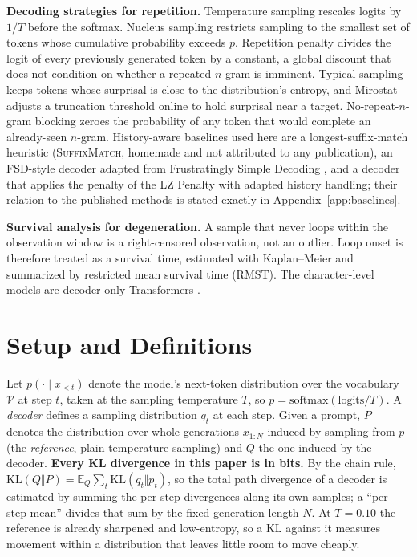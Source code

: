 \documentclass[11pt]{article}
\newcommand{\KL}{\mathrm{KL}}
\newcommand{\E}{\mathbb{E}}
\begin{document}
\textbf{Decoding strategies for repetition.} Temperature sampling rescales logits by $1/T$ before the softmax. Nucleus sampling \citep{holtzman2020curious} restricts sampling to the smallest set of tokens whose cumulative probability exceeds $p$. Repetition penalty \citep{keskar2019ctrl} divides the logit of every previously generated token by a constant, a global discount that does not condition on whether a repeated $n$-gram is imminent. Typical sampling \citep{meister2023typical} keeps tokens whose surprisal is close to the distribution's entropy, and Mirostat \citep{basu2021mirostat} adjusts a truncation threshold online to hold surprisal near a target. No-repeat-$n$-gram blocking \citep{paulus2018deep} zeroes the probability of any token that would complete an already-seen $n$-gram. History-aware baselines used here are a longest-suffix-match heuristic (\textsc{SuffixMatch}, homemade and not attributed to any publication), an FSD-style decoder adapted from Frustratingly Simple Decoding \citep{yang2023frustratingly}, and a decoder that applies the penalty of the LZ Penalty \citep{ginart2025lzpenalty} with adapted history handling; their relation to the published methods is stated exactly in Appendix~\ref{app:baselines}.

\textbf{Survival analysis for degeneration.} A sample that never loops within the observation window is a right-censored observation, not an outlier. Loop onset is therefore treated as a survival time, estimated with Kaplan--Meier \citep{kaplan1958nonparametric} and summarized by restricted mean survival time (RMST). The character-level models are decoder-only Transformers \citep{vaswani2017attention}.

\section{Setup and Definitions}
\label{sec:formal}

Let $p(\cdot\mid x_{<t})$ denote the model's next-token distribution over the vocabulary $\mathcal{V}$ at step $t$, taken at the sampling temperature $T$, so $p=\mathrm{softmax}(\text{logits}/T)$. A \emph{decoder} defines a sampling distribution $q_t$ at each step. Given a prompt, $P$ denotes the distribution over whole generations $x_{1:N}$ induced by sampling from $p$ (the \emph{reference}, plain temperature sampling) and $Q$ the one induced by the decoder. \textbf{Every KL divergence in this paper is in bits.} By the chain rule, $\KL(Q\Vert P)=\E_Q\sum_{t}\KL(q_t\Vert p_t)$, so the total path divergence of a decoder is estimated by summing the per-step divergences along its own samples; a ``per-step mean'' divides that sum by the fixed generation length $N$. At $T{=}0.10$ the reference is already sharpened and low-entropy, so a KL against it measures movement within a distribution that leaves little room to move cheaply.
\end{document}
